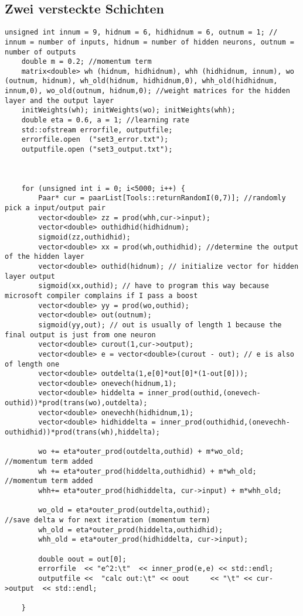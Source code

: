 \documentclass[10pt]{article}
\begin{document}
\subsection{Zwei versteckte Schichten}
\begin{lstlisting}
unsigned int innum = 9, hidnum = 6, hidhidnum = 6, outnum = 1; // innum = number of inputs, hidnum = number of hidden neurons, outnum = number of outputs
	double m = 0.2; //momentum term
	matrix<double> wh (hidnum, hidhidnum), whh (hidhidnum, innum), wo (outnum, hidnum), wh_old(hidnum, hidhidnum,0), whh_old(hidhidnum, innum,0), wo_old(outnum, hidnum,0); //weight matrices for the hidden layer and the output layer
	initWeights(wh); initWeights(wo); initWeights(whh);
	double eta = 0.6, a = 1; //learning rate
	std::ofstream errorfile, outputfile;
	errorfile.open  ("set3_error.txt");
	outputfile.open ("set3_output.txt");
	
	

	for (unsigned int i = 0; i<5000; i++) {
		Paar* cur = paarList[Tools::returnRandomI(0,7)]; //randomly pick a input/output pair
		vector<double> zz = prod(whh,cur->input);
		vector<double> outhidhid(hidhidnum);
		sigmoid(zz,outhidhid);
		vector<double> xx = prod(wh,outhidhid); //determine the output of the hidden layer
		vector<double> outhid(hidnum); // initialize vector for hidden layer output
		sigmoid(xx,outhid); // have to program this way because microsoft compiler complains if I pass a boost
		vector<double> yy = prod(wo,outhid);
		vector<double> out(outnum);
		sigmoid(yy,out); // out is usually of length 1 because the final output is just from one neuron
		vector<double> curout(1,cur->output);
		vector<double> e = vector<double>(curout - out); // e is also of length one
		vector<double> outdelta(1,e[0]*out[0]*(1-out[0]));
		vector<double> onevech(hidnum,1);
		vector<double> hiddelta = inner_prod(outhid,(onevech-outhid))*prod(trans(wo),outdelta);
		vector<double> onevechh(hidhidnum,1);
		vector<double> hidhiddelta = inner_prod(outhidhid,(onevechh-outhidhid))*prod(trans(wh),hiddelta);

		wo += eta*outer_prod(outdelta,outhid) + m*wo_old;       //momentum term added
		wh += eta*outer_prod(hiddelta,outhidhid) + m*wh_old;   //momentum term added
		whh+= eta*outer_prod(hidhiddelta, cur->input) + m*whh_old;

		wo_old = eta*outer_prod(outdelta,outhid);                   //save delta w for next iteration (momentum term)
		wh_old = eta*outer_prod(hiddelta,outhidhid);
		whh_old = eta*outer_prod(hidhiddelta, cur->input);
		
		double oout = out[0];
		errorfile  << "e^2:\t"  << inner_prod(e,e) << std::endl;
		outputfile <<  "calc out:\t" << oout     << "\t" << cur->output  << std::endl;

	}

\end{lstlisting}
\end{document}
